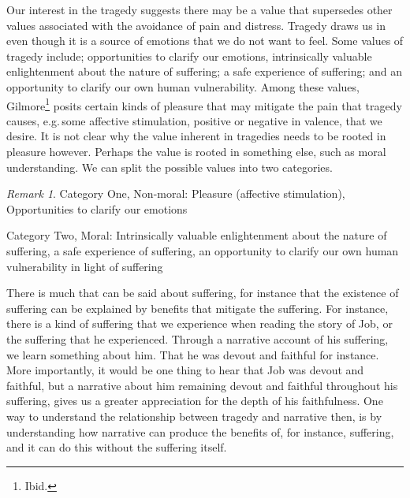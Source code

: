 \documentclass[
  12pt,
]{book}
\theoremstyle{definition}
\theoremstyle{definition}
\theoremstyle{definition}
\theoremstyle{definition}
\theoremstyle{remark}
\newtheorem*{remark}{Remark}
\begin{document}
Our interest in the tragedy suggests there may be a value that supersedes other values associated with the avoidance of pain and distress. Tragedy draws us in even though it is a source of emotions that we do not want to feel. Some values of tragedy include; opportunities to clarify our emotions, intrinsically valuable enlightenment about the nature of suffering; a safe experience of suffering; and an opportunity to clarify our own human vulnerability. Among these values, Gilmore\footnote{Ibid.} posits certain kinds of pleasure that may mitigate the pain that tragedy causes, e.g.\,some affective stimulation, positive or negative in valence, that we desire. It is not clear why the value inherent in tragedies needs to be rooted in pleasure however. Perhaps the value is rooted in something else, such as moral understanding. We can split the possible values into two categories.

\begin{remark}
Category One, Non-moral: Pleasure (affective stimulation), Opportunities to clarify our emotions

Category Two, Moral: Intrinsically valuable enlightenment about the nature of suffering, a safe experience of suffering, an opportunity to clarify our own human vulnerability in light of suffering
\end{remark}

There is much that can be said about suffering, for instance that the existence of suffering can be explained by benefits that mitigate the suffering. For instance, there is a kind of suffering that we experience when reading the story of Job, or the suffering that he experienced. Through a narrative account of his suffering, we learn something about him. That he was devout and faithful for instance. More importantly, it would be one thing to hear that Job was devout and faithful, but a narrative about him remaining devout and faithful throughout his suffering, gives us a greater appreciation for the depth of his faithfulness. One way to understand the relationship between tragedy and narrative then, is by understanding how narrative can produce the benefits of, for instance, suffering, and it can do this without the suffering itself.
\end{document}
